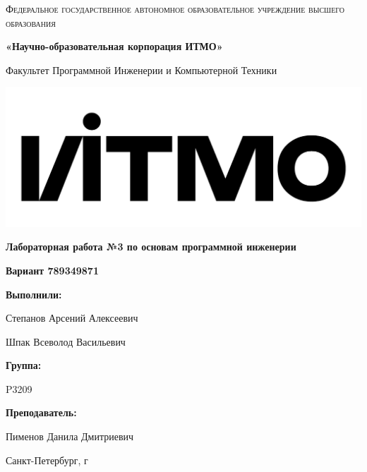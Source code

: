 \documentclass[12pt,a4paper]{article}
\begin{document}
\begin{titlepage} 
	\centering
	{
        \scshape
        Федеральное государственное автономное образовательное учреждение высшего образования
        \par
        \textbf{«Научно-образовательная корпорация ИТМО»}
        \par
        \vspace{1cm}
        Факультет Программной Инженерии и Компьютерной Техники
        \par
    }
    \vspace{0.6cm}
    \includegraphics[width=\textwidth]{logo.png}
    {
        \Large
        \textbf{Лабораторная работа №3 по основам программной инженерии}
        \par
        \normalsize
        \vspace{0.75cm}
        \textbf{Вариант 789349871}
        \par
    }
    \vfill
    \hfill\begin{minipage}{\dimexpr\textwidth-7.8cm}
        \textbf{Выполнили:}\par
        Степанов Арсений Алексеевич\par
        Шпак Всеволод Васильевич\par
        \vspace{0.15cm}
        \textbf{Группа:}\par
        P3209\par
        \vspace{0.15cm}
        \textbf{Преподаватель:}\par
        Пименов Данила Дмитриевич\par
    \end{minipage}
    \vfill
    Санкт-Петербург, \the\year{}г
\end{titlepage}  
\end{document}
